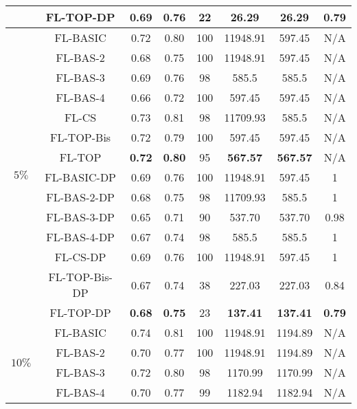 \documentclass[accepted]{uai2021} %
\begin{document}
\begin{table*}[!ht]
{\begin{tabular}{|c|c|c|c|c|c|c|c|}
        \cline{2-8}
        &  FL-TOP-DP &  \textbf{0.69}  & \textbf{0.76} & 22 & \textbf{26.29} & \textbf{26.29} & \textbf{0.79}\\
        \hline 
        \hline
        \multirow{14}{*}{$5\%$} &  FL-BASIC  & 0.72 & 0.80 & 100 & 11948.91 & 597.45 &N/A\\
        \cline{2-8}
        &  FL-BAS-2  & 0.68 & 0.75 & 100 & 11948.91 & 597.45 &N/A  \\
        \cline{2-8}
        &  FL-BAS-3 & 0.69 & 0.76 & 98 & 585.5 & 585.5 &N/A \\
        \cline{2-8}
        &  FL-BAS-4 &  0.66  & 0.72 & 100 & 597.45 & 597.45 &N/A \\
        \cline{2-8}
        &  FL-CS &   0.73 & 0.81 & 98 & 11709.93 & 585.5 & N/A \\
        \cline{2-8}
        &  FL-TOP-Bis &  0.72 & 0.79 & 100 & 597.45 & 597.45 &N/A \\
        \cline{2-8}
        &  FL-TOP &  \textbf{0.72}  & \textbf{0.80} & 95 & \textbf{567.57} & \textbf{567.57} &N/A \\
        \cline{2-8}
        &  FL-BASIC-DP  & 0.69 & 0.76 & 100 & 11948.91 & 597.45 & 1 \\
        \cline{2-8}
        &  FL-BAS-2-DP  & 0.68 & 0.75 & 98 & 11709.93 & 585.5 & 1 \\
        \cline{2-8}
        &  FL-BAS-3-DP &  0.65  & 0.71 & 90 & 537.70 & 537.70 & 0.98\\
        \cline{2-8}
        &  FL-BAS-4-DP &  0.67  & 0.74 & 98 & 585.5 & 585.5 & 1\\
        \cline{2-8}
        &  FL-CS-DP &  0.69  & 0.76 & 100 & 11948.91 & 597.45 & 1\\
        \cline{2-8}
        &  FL-TOP-Bis-DP &  0.67  & 0.74 & 38 & 227.03 & 227.03 & 0.84 \\
        \cline{2-8}
        &  FL-TOP-DP & \textbf{0.68} & \textbf{0.75} & 23 & \textbf{137.41} & \textbf{137.41} & \textbf{0.79}\\
        \hline 
        \hline
        \multirow{14}{*}{$10\%$} &  FL-BASIC  & 0.74 & 0.81 & 100 & 11948.91 & 1194.89 &N/A \\
        \cline{2-8}
        &  FL-BAS-2  & 0.70 & 0.77 & 100 & 11948.91 & 1194.89 &N/A  \\
        \cline{2-8}
        &  FL-BAS-3 &  0.72  & 0.80 & 98 & 1170.99 & 1170.99 &N/A \\
        \cline{2-8}
        &  FL-BAS-4 &  0.70  & 0.77 & 99 & 1182.94 & 1182.94 & N/A \\

\end{tabular}}
\end{table*}
\end{document}
